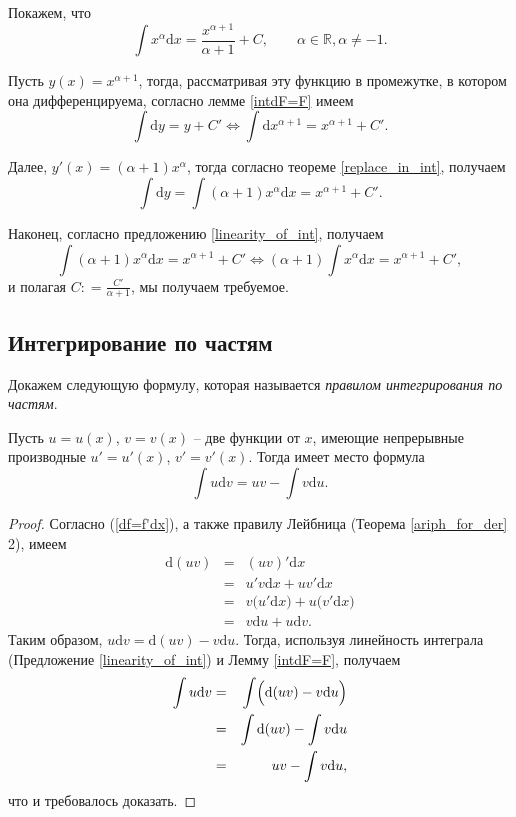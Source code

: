 \begin{example}
    Покажем, что 
    \[
     \int x^\alpha \mathrm{d}x = \frac{x^{\alpha+1}}{\alpha+1} + C, \qquad \alpha \in \mathbb{R}, \alpha \ne -1.
    \]

Пусть $y(x) = x^{\alpha+1}$, тогда, рассматривая эту функцию в промежутке, в котором она дифференцируема, согласно лемме \ref{intdF=F} имеем
\[
 \int \mathrm{d}y = y+ C' \Longleftrightarrow \int \mathrm{d} x^{\alpha +1} = x^{\alpha +1} + C'.
\]

Далее, $y'(x) = (\alpha +1) x^\alpha$, тогда согласно теореме \ref{replace_in_int}, получаем
\[
 \int \mathrm{d}y = \int (\alpha +1) x^{\alpha} \mathrm{d}x =  x^{\alpha +1} + C'.
\]

Наконец, согласно предложению \ref{linearity_of_int}, получаем
\[
 \int (\alpha +1) x^{\alpha} \mathrm{d}x =  x^{\alpha +1} + C' \Longleftrightarrow (\alpha +1) \int x^\alpha \mathrm{d}x = x^{\alpha +1} + C',
\]
и полагая $C: = \frac{C'}{\alpha +1}$, мы получаем требуемое.
\end{example}


\subsection{Интегрирование по частям}

Докажем следующую формулу, которая называется \textit{правилом интегрирования по частям}.

\begin{theorem}
    Пусть $u = u(x)$, $v= v(x)$ -- две функции от $x$, имеющие непрерывные производные $u'= u'(x)$, $v' = v'(x)$. Тогда имеет место формула
    \[
     \int u \mathrm{d}v = uv - \int v \mathrm{d}u.
    \]
\end{theorem}
\begin{proof}

Согласно (\ref{df=f'dx}), а также правилу Лейбница (Теорема \ref{ariph_for_der} 2), имеем 
    \begin{eqnarray*}
        \mathrm{d}(uv) &=& (uv)' \mathrm{d}x \\
        &=& u'v \mathrm{d}x + uv'\mathrm{d}x \\
        &=& v \bigl( u'\mathrm{d}x\bigr) + u \bigl( v'\mathrm{d}x \bigr) \\
        &=& v \mathrm{d}u + u \mathrm{d}v.
    \end{eqnarray*}
Таким образом, $u\mathrm{d}v = \mathrm{d}(uv) - v \mathrm{d}u$. Тогда, используя линейность интеграла (Предложение \ref{linearity_of_int}) и Лемму \ref{intdF=F}, получаем
\begin{eqnarray*}
    \int u \mathrm{d}v &=& \int \Bigl(  \mathrm{d}(uv) - v \mathrm{d}u \Bigr) \\
     &=& \int \mathrm{d}(uv) - \int v \mathrm{d}u \\
     &=& uv - \int v \mathrm{d}u,
\end{eqnarray*}
что и требовалось доказать.    
\end{proof}

